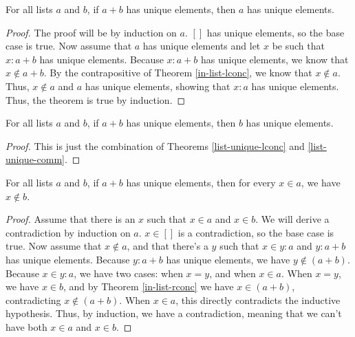 \documentclass[../math.tex]{subfiles}
\begin{document}
\begin{theorem} \label{list-unique-lconc}
    For all lists $a$ and $b$, if $a + b$ has unique elements, then $a$ has
    unique elements.
\end{theorem}
\begin{proof}
    The proof will be by induction on $a$.  $[]$ has unique elements, so the
    base case is true.  Now assume that $a$ has unique elements and let $x$ be
    such that $x : a + b$ has unique elements.  Because $x : a + b$ has unique
    elements, we know that $x \notin a + b$.  By the contrapositive of Theorem
    \ref{in-list-lconc}, we know that $x \notin a$.  Thus, $x \notin a$ and $a$
    has unique elements, showing that $x : a$ has unique elements.  Thus, the
    theorem is true by induction.
\end{proof}

\begin{theorem} \label{list-unique-rconc}
    For all lists $a$ and $b$, if $a + b$ has unique elements, then $b$ has
    unique elements.
\end{theorem}
\begin{proof}
    This is just the combination of Theorems \ref{list-unique-lconc} and
    \ref{list-unique-comm}.
\end{proof}

\begin{theorem} \label{list-unique-conc}
    For all lists $a$ and $b$, if $a + b$ has unique elements, then for every $x
    \in a$, we have $x \notin b$.
\end{theorem}
\begin{proof}
    Assume that there is an $x$ such that $x \in a$ and $x \in b$.  We will
    derive a contradiction by induction on $a$.  $x \in []$ is a contradiction,
    so the base case is true.  Now assume that $x \notin a$, and that there's a
    $y$ such that $x \in y : a$ and $y : a + b$ has unique elements.  Because $y
    : a + b$ has unique elements, we have $y \notin (a + b)$.  Because $x \in y
    : a$, we have two cases: when $x = y$, and when $x \in a$.  When $x = y$, we
    have $x \in b$, and by Theorem \ref{in-list-rconc} we have $x \in (a + b)$,
    contradicting $x \notin (a + b)$.  When $x \in a$, this directly
    contradicts the inductive hypothesis.  Thus, by induction, we have a
    contradiction, meaning that we can't have both $x \in a$ and $x \in b$.
\end{proof}
\end{document}
